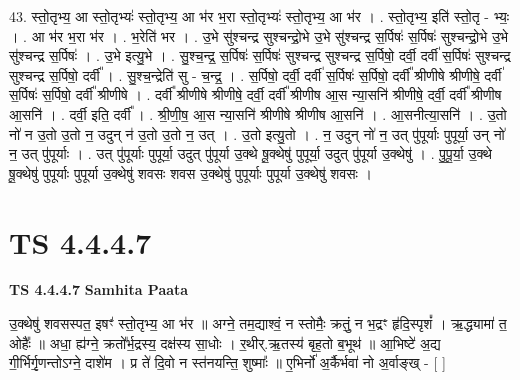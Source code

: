 \documentclass[17pt]{extarticle}
\begin{document}
43. स्तो॒तृभ्य॒ आ स्तो॒तृभ्यः॑ स्तो॒तृभ्य॒ आ भ॑र भ॒रा स्तो॒तृभ्यः॑ स्तो॒तृभ्य॒ आ भ॑र । . स्तो॒तृभ्य॒ इति॑ स्तो॒तृ - भ्यः॒ । . आ भ॑र भ॒रा भ॑र । . भ॒रेति॑ भर । . उ॒भे सु॑श्चन्द्र सुश्चन्द्रो॒भे उ॒भे सु॑श्चन्द्र स॒र्पिषः॑ स॒र्पिषः॑ सुश्चन्द्रो॒भे उ॒भे सु॑श्चन्द्र स॒र्पिषः॑ । . उ॒भे इत्यु॒भे । . सु॒श्च॒न्द्र॒ स॒र्पिषः॑ स॒र्पिषः॑ सुश्चन्द्र सुश्चन्द्र स॒र्पिषो॒ दर्वी॒ दर्वी॑ स॒र्पिषः॑ सुश्चन्द्र सुश्चन्द्र स॒र्पिषो॒ दर्वी᳚ । . सु॒श्च॒न्द्रेति॑ सु - च॒न्द्र॒ । . स॒र्पिषो॒ दर्वी॒ दर्वी॑ स॒र्पिषः॑ स॒र्पिषो॒ दर्वी᳚ श्रीणीषे श्रीणीषे॒ दर्वी॑ स॒र्पिषः॑ स॒र्पिषो॒ दर्वी᳚ श्रीणीषे । . दर्वी᳚ श्रीणीषे श्रीणीषे॒ दर्वी॒ दर्वी᳚ श्रीणीष आ॒स न्या॒सनि॑ श्रीणीषे॒ दर्वी॒ दर्वी᳚ श्रीणीष आ॒सनि॑ । . दर्वी॒ इति॒ दर्वी᳚ । . श्री॒णी॒ष॒ आ॒स न्या॒सनि॑ श्रीणीषे श्रीणीष आ॒सनि॑ । . आ॒सनीत्या॒सनि॑ । . उ॒तो नो॑ न उ॒तो उ॒तो न॒ उदुन् न॑ उ॒तो उ॒तो न॒ उत् । . उ॒तो इत्यु॒तो । . न॒ उदुन् नो॑ न॒ उत् पु॑पूर्याः पुपूर्या॒ उन् नो॑ न॒ उत् पु॑पूर्याः । . उत् पु॑पूर्याः पुपूर्या॒ उदुत् पु॑पूर्या उ॒क्थे षू॒क्थेषु॑ पुपूर्या॒ उदुत् पु॑पूर्या उ॒क्थेषु॑ । . पु॒पू॒र्या॒ उ॒क्थे षू॒क्थेषु॑ पुपूर्याः पुपूर्या उ॒क्थेषु॑ शवसः शवस उ॒क्थेषु॑ पुपूर्याः पुपूर्या उ॒क्थेषु॑ शवसः । \newline
\pagebreak
{}

\section{ TS 4.4.4.7 }

\textbf{TS 4.4.4.7 } \newline
\textbf{Samhita Paata} \newline

उ॒क्थेषु॑ शवसस्पत॒ इषꣳ॑ स्तो॒तृभ्य॒ आ भ॑र ॥ अग्ने॒ तम॒द्याश्वं॒ न स्तोमैः॒ क्रतुं॒ न भ॒द्रꣳ हृ॑दि॒स्पृशं᳚ । ऋ॒द्ध्यामा॑ त॒ ओहैः᳚ ॥ अधा॒ ह्य॑ग्ने॒ क्रतो᳚र्भ॒द्रस्य॒ दक्ष॑स्य सा॒धोः । र॒थीर्.ऋ॒तस्य॑ बृह॒तो ब॒भूथ॑ ॥ आ॒भिष्टे॑ अ॒द्य गी॒र्भिर्गृ॒णन्तोऽग्ने॒ दाशे॑म । प्र ते॑ दि॒वो न स्त॑नयन्ति॒ शुष्माः᳚ ॥ ए॒भिर्नो॑ अ॒र्कैर्भवा॑ नो अ॒र्वाङ्ख् - [  ] \newline
\end{document}
